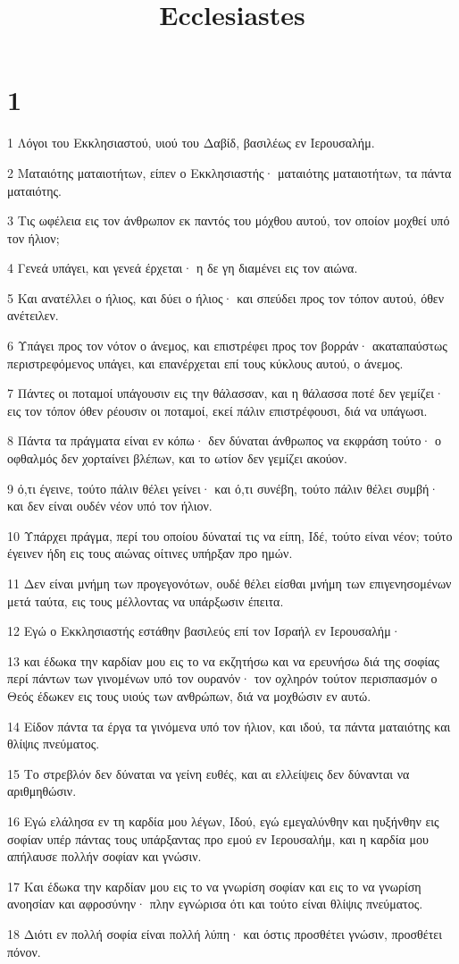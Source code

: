 

\title{Ecclesiastes}


\chapter{1}

\par 1 Λόγοι του Εκκλησιαστού, υιού του Δαβίδ, βασιλέως εν Ιερουσαλήμ.
\par 2 Ματαιότης ματαιοτήτων, είπεν ο Εκκλησιαστής· ματαιότης ματαιοτήτων, τα πάντα ματαιότης.
\par 3 Τις ωφέλεια εις τον άνθρωπον εκ παντός του μόχθου αυτού, τον οποίον μοχθεί υπό τον ήλιον;
\par 4 Γενεά υπάγει, και γενεά έρχεται· η δε γη διαμένει εις τον αιώνα.
\par 5 Και ανατέλλει ο ήλιος, και δύει ο ήλιος· και σπεύδει προς τον τόπον αυτού, όθεν ανέτειλεν.
\par 6 Υπάγει προς τον νότον ο άνεμος, και επιστρέφει προς τον βορράν· ακαταπαύστως περιστρεφόμενος υπάγει, και επανέρχεται επί τους κύκλους αυτού, ο άνεμος.
\par 7 Πάντες οι ποταμοί υπάγουσιν εις την θάλασσαν, και η θάλασσα ποτέ δεν γεμίζει· εις τον τόπον όθεν ρέουσιν οι ποταμοί, εκεί πάλιν επιστρέφουσι, διά να υπάγωσι.
\par 8 Πάντα τα πράγματα είναι εν κόπω· δεν δύναται άνθρωπος να εκφράση τούτο· ο οφθαλμός δεν χορταίνει βλέπων, και το ωτίον δεν γεμίζει ακούον.
\par 9 ό,τι έγεινε, τούτο πάλιν θέλει γείνει· και ό,τι συνέβη, τούτο πάλιν θέλει συμβή· και δεν είναι ουδέν νέον υπό τον ήλιον.
\par 10 Υπάρχει πράγμα, περί του οποίου δύναταί τις να είπη, Ιδέ, τούτο είναι νέον; τούτο έγεινεν ήδη εις τους αιώνας οίτινες υπήρξαν προ ημών.
\par 11 Δεν είναι μνήμη των προγεγονότων, ουδέ θέλει είσθαι μνήμη των επιγενησομένων μετά ταύτα, εις τους μέλλοντας να υπάρξωσιν έπειτα.
\par 12 Εγώ ο Εκκλησιαστής εστάθην βασιλεύς επί τον Ισραήλ εν Ιερουσαλήμ·
\par 13 και έδωκα την καρδίαν μου εις το να εκζητήσω και να ερευνήσω διά της σοφίας περί πάντων των γινομένων υπό τον ουρανόν· τον οχληρόν τούτον περισπασμόν ο Θεός έδωκεν εις τους υιούς των ανθρώπων, διά να μοχθώσιν εν αυτώ.
\par 14 Είδον πάντα τα έργα τα γινόμενα υπό τον ήλιον, και ιδού, τα πάντα ματαιότης και θλίψις πνεύματος.
\par 15 Το στρεβλόν δεν δύναται να γείνη ευθές, και αι ελλείψεις δεν δύνανται να αριθμηθώσιν.
\par 16 Εγώ ελάλησα εν τη καρδία μου λέγων, Ιδού, εγώ εμεγαλύνθην και ηυξήνθην εις σοφίαν υπέρ πάντας τους υπάρξαντας προ εμού εν Ιερουσαλήμ, και η καρδία μου απήλαυσε πολλήν σοφίαν και γνώσιν.
\par 17 Και έδωκα την καρδίαν μου εις το να γνωρίση σοφίαν και εις το να γνωρίση ανοησίαν και αφροσύνην· πλην εγνώρισα ότι και τούτο είναι θλίψις πνεύματος.
\par 18 Διότι εν πολλή σοφία είναι πολλή λύπη· και όστις προσθέτει γνώσιν, προσθέτει πόνον.


